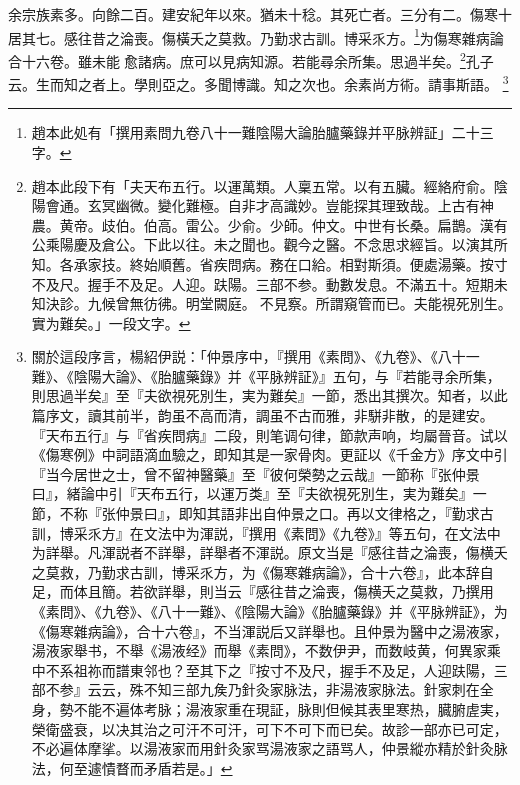 余宗族素多。向餘二百。建安紀年以來。猶未十稔。其死亡者。三分有二。傷寒十居其七。感往昔之淪喪。傷橫夭之莫救。乃勤求古訓。博采乑方。\footnote{趙本此処有「撰用素問九卷八十一難陰陽大論胎臚藥錄并平脉辨証」二十三字。}为傷寒雜病論合十六卷。雖未能{\sungii 𥁞}愈諸病。庶可以見病知源。若能尋余所集。思過半矣。\footnote{趙本此段下有「夫天布五行。以運萬類。人稟五常。以有五臟。經絡府俞。陰陽會通。玄冥幽微。變化難極。自非才高識妙。豈能探其理致哉。上古有神農。黄帝。歧伯。伯高。雷公。少俞。少師。仲文。中世有长桑。扁鵲。漢有公乘陽慶及倉公。下此以往。未之聞也。觀今之醫。不念思求經旨。以演其所知。各承家技。終始順舊。省疾問病。務在口給。相對斯須。便處湯藥。按寸不及尺。握手不及足。人迎。趺陽。三部不参。動數发息。不滿五十。短期未知決診。九候曾無彷彿。明堂闕庭。{\sungii 𥁞}不見察。所謂窺管而已。夫能視死別生。實为難矣。」一段文字。}孔子云。生而知之者上。學則亞之。多聞博識。知之次也。余素尚方術。請事斯語。
	\footnote{
		關於這段序言，楊紹伊説：「仲景序中，『撰用《素問》、《九卷》、《八十一難》、《陰陽大論》、《胎臚藥錄》并《平脉辨証》』五句，与『若能寻余所集，則思過半矣』至『夫欲視死別生，実为難矣』一節，悉出其撰次。知者，以此篇序文，讀其前半，韵虽不高而清，調虽不古而雅，非駢非散，的是建安。『天布五行』与『省疾問病』二段，則笔调句律，節款声响，均屬晉音。试以《傷寒例》中詞語滴血驗之，即知其是一家骨肉。更証以《千金方》序文中引『当今居世之士，曾不留神醫藥』至『彼何榮勢之云哉』一節称『张仲景曰』，緒論中引『天布五行，以運万类』至『夫欲視死別生，実为難矣』一節，不称『张仲景曰』，即知其語非出自仲景之口。再以文律格之，『勤求古訓，博采乑方』在文法中为渾説，『撰用《素問》《九卷》』等五句，在文法中为詳舉。凡渾説者不詳舉，詳舉者不渾説。原文当是『感往昔之淪喪，傷横夭之莫救，乃勤求古訓，博采乑方，为《傷寒雜病論》，合十六卷』，此本辞自足，而体且簡。若欲詳舉，則当云『感往昔之淪喪，傷横夭之莫救，乃撰用《素問》、《九卷》、《八十一難》、《陰陽大論》《胎臚藥錄》并《平脉辨証》，为《傷寒雜病論》，合十六卷』，不当渾説后又詳舉也。且仲景为醫中之湯液家，湯液家舉书，不舉《湯液经》而舉《素問》，不数伊尹，而数岐黄，何異家乘中不系祖祢而譜東邻也？至其下之『按寸不及尺，握手不及足，人迎趺陽，三部不参』云云，殊不知三部九矦乃針灸家脉法，非湯液家脉法。針家刺在全身，勢不能不遍体考脉；湯液家重在現証，脉則但候其表里寒热，臓腑虗実，榮衛盛衰，以决其治之可汗不可汗，可下不可下而已矣。故診一部亦已可定，不必遍体摩挲。以湯液家而用針灸家骂湯液家之語骂人，仲景縱亦精於針灸脉法，何至遽憒瞀而矛盾若是。」
	}

\endinput
